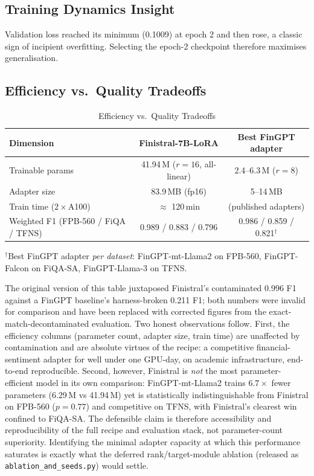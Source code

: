 \documentclass[a4paper]{article}
\begin{document}
\subsection{Training Dynamics Insight}

Validation loss reached its minimum (0.1009) at epoch 2 and then rose, a classic sign of incipient overfitting. Selecting the epoch-2 checkpoint therefore maximises generalisation.

\subsection{Efficiency vs.\ Quality Tradeoffs}

\begin{table}[htbp]
\centering
\caption{Efficiency vs.\ Quality Tradeoffs}
\label{tab:efficiency}
\begin{tabular}{lcc}
\toprule
\textbf{Dimension} & \textbf{Finistral-7B-LoRA} & \textbf{Best FinGPT adapter} \\
\midrule
Trainable params  & 41.94\,M ($r{=}16$, all-linear) & 2.4--6.3\,M ($r{=}8$) \\
Adapter size      & 83.9\,MB (fp16)  & 5--14\,MB \\
Train time ($2\times$A100) & $\approx$ 120\,min & (published adapters) \\
Weighted F1 (FPB-560 / FiQA / TFNS) & 0.989 / 0.883 / 0.796 & 0.986 / 0.859 / 0.821$^{\dagger}$ \\
\bottomrule
\end{tabular}
\par\smallskip
{\footnotesize $^{\dagger}$Best FinGPT adapter \emph{per dataset}: FinGPT-mt-Llama2 on FPB-560, FinGPT-Falcon on FiQA-SA, FinGPT-Llama-3 on TFNS.}
\end{table}

The original version of this table juxtaposed Finistral's contaminated 0.996 F1 against a FinGPT baseline's harness-broken 0.211 F1; both numbers were invalid for comparison and have been replaced with corrected figures from the exact-match-decontaminated evaluation. Two honest observations follow. First, the efficiency columns (parameter count, adapter size, train time) are unaffected by contamination and are absolute virtues of the recipe: a competitive financial-sentiment adapter for well under one GPU-day, on academic infrastructure, end-to-end reproducible. Second, however, Finistral is \emph{not} the most parameter-efficient model in its own comparison: FinGPT-mt-Llama2 trains $6.7\times$ fewer parameters (6.29\,M vs 41.94\,M) yet is statistically indistinguishable from Finistral on FPB-560 ($p=0.77$) and competitive on TFNS, with Finistral's clearest win confined to FiQA-SA. The defensible claim is therefore accessibility and reproducibility of the full recipe and evaluation stack, not parameter-count superiority. Identifying the minimal adapter capacity at which this performance saturates is exactly what the deferred rank/target-module ablation (released as \texttt{ablation\_and\_seeds.py}) would settle.
\end{document}
